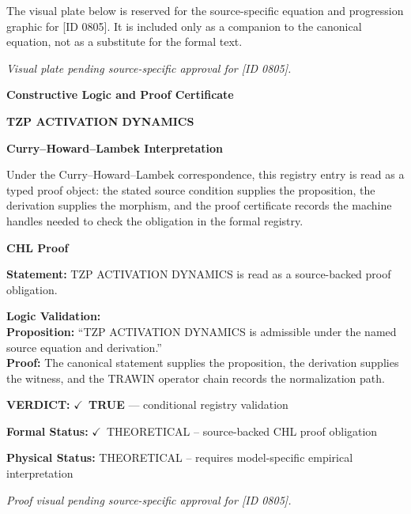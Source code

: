 \begingroup\footnotesize\sloppy
The visual plate below is reserved for the source-specific equation and progression graphic for [ID 0805]. It is included only as a companion to the canonical equation, not as a substitute for the formal text.
\par\endgroup
\begingroup\footnotesize\itshape
Visual plate pending source-specific approval for [ID 0805].
\par\endgroup

\clearpage
\begingroup\tzpsupportsetup
\noindent\textbf{\fontsize{10.8pt}{12.8pt}\selectfont [ID 0805] Constructive Logic and Proof Certificate}\par
\noindent\textbf{\fontsize{10pt}{12pt}\selectfont TZP ACTIVATION DYNAMICS}\par
\vspace{0.45em}
\begingroup
\footnotesize
\setlength{\parskip}{0.22em}
\setlength{\parindent}{0pt}
\noindent\textbf{Curry--Howard--Lambek Interpretation}\par
Under the Curry--Howard--Lambek correspondence, this registry entry is read as a typed proof
object: the stated source condition supplies the proposition, the derivation supplies the
morphism, and the proof certificate records the machine handles needed to check the obligation
in the formal registry.

\vspace{0.45em}
\noindent\textbf{CHL Proof}\par
\textbf{Statement:} TZP ACTIVATION DYNAMICS is read as a source-backed proof obligation.

\textbf{Logic Validation:}\\
\textbf{Proposition:} ``TZP ACTIVATION DYNAMICS is admissible under the named source equation and derivation.''\\
\textbf{Proof:} The canonical statement supplies the proposition, the derivation supplies the witness, and the TRAWIN operator chain records the normalization path.

\textbf{VERDICT:} \ensuremath{\checkmark}\ \textbf{TRUE} --- conditional registry validation

\textbf{Formal Status:} \ensuremath{\checkmark}\ THEORETICAL -- source-backed CHL proof obligation

\textbf{Physical Status:} THEORETICAL -- requires model-specific empirical interpretation
\par\vspace{0.45em}
\par
\vfill
\begingroup\footnotesize\itshape
Proof visual pending source-specific approval for [ID 0805].
\par\endgroup
\vfill
\endgroup
\endgroup
